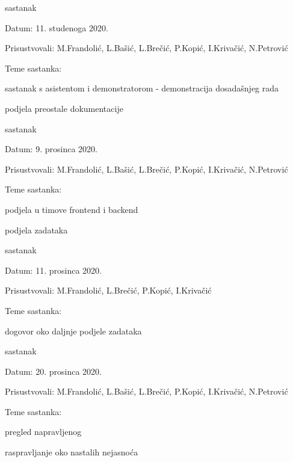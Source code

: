 \begin{packed_enum}
			\item sastanak
			\item[] \begin{packed_item}
				\item Datum: 11. studenoga 2020.
				\item Prisustvovali: M.Frandolić, L.Bašić, L.Brečić, P.Kopić, I.Krivačić, N.Petrović
				\item Teme sastanka:
				\begin{packed_item}
					\item sastanak s asistentom i demonstratorom - demonstracija dosadašnjeg rada
					\item podjela preostale dokumentacije
				\end{packed_item}
			\end{packed_item}
		
			\item sastanak
			\item[] \begin{packed_item}
				\item Datum: 9. prosinca 2020.
				\item Prisustvovali: M.Frandolić, L.Bašić, L.Brečić, P.Kopić, I.Krivačić, N.Petrović
				\item Teme sastanka:
				\begin{packed_item}
					\item podjela u timove frontend i backend
					\item podjela zadataka
				\end{packed_item}
			\end{packed_item}
			
			\item sastanak
			\item[] \begin{packed_item}
				\item Datum: 11. prosinca 2020.
				\item Prisustvovali: M.Frandolić, L.Brečić, P.Kopić, I.Krivačić
				\item Teme sastanka:
				\begin{packed_item}
					\item dogovor oko daljnje podjele zadataka
				\end{packed_item}
			\end{packed_item}	
			
			\item sastanak
			\item[] \begin{packed_item}
				\item Datum: 20. prosinca 2020.
				\item Prisustvovali: M.Frandolić, L.Bašić, L.Brečić, P.Kopić, I.Krivačić, N.Petrović
				\item Teme sastanka:
				\begin{packed_item}
					\item pregled napravljenog
					\item raspravljanje oko nastalih nejasnoća
				\end{packed_item}
			\end{packed_item}
		

\end{packed_enum}
